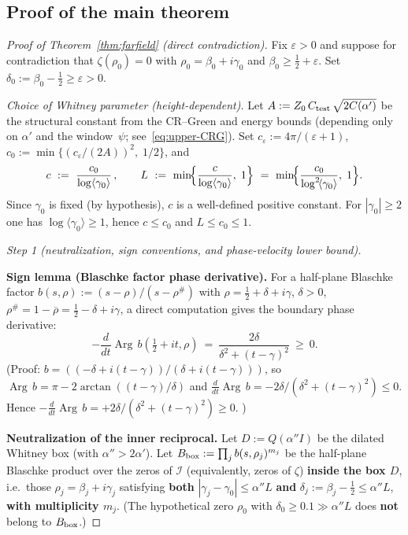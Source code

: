 \documentclass[11pt]{amsart}
\theoremstyle{definition}
\theoremstyle{remark}
\newcommand{\angles}[1]{\langle #1\rangle}
\DeclareMathOperator{\Arg}{Arg}
\begin{document}
\subsection{Proof of the main theorem}\label{sec:proof-farfield}
\begin{proof}[Proof of Theorem~\ref{thm:farfield} (direct contradiction)]
Fix $\varepsilon>0$ and suppose for contradiction that $\zeta(\rho_0)=0$
with $\rho_0=\beta_0+i\gamma_0$ and $\beta_0\ge \tfrac12+\varepsilon$.
Set $\delta_0:=\beta_0-\tfrac12\ge \varepsilon>0$.

\medskip\noindent\emph{Choice of Whitney parameter (height-dependent).}
Let $A:=Z_0\,C_{\rm test}\,\sqrt{2C(\alpha')}$ be the structural constant from the CR--Green
and energy bounds (depending only on $\alpha'$ and the window~$\psi$; see~\eqref{eq:upper-CRG}).
Set $c_\varepsilon:=4\pi/(\varepsilon+1)$, $c_0:=\min\bigl\{(c_\varepsilon/(2A))^2,\;1/2\bigr\}$, and
\[
  c\ :=\ \frac{c_0}{\log\angles{\gamma_0}}\,,\qquad
  L\ :=\ \min\!\Bigl\{\frac{c}{\log\angles{\gamma_0}},\;1\Bigr\}
  \ =\ \min\!\Bigl\{\frac{c_0}{\log^2\!\angles{\gamma_0}},\;1\Bigr\}.
\]
Since $\gamma_0$ is fixed (by hypothesis), $c$ is a well-defined positive constant.
For $|\gamma_0|\ge 2$ one has $\log\angles{\gamma_0}\ge 1$, hence $c\le c_0$ and $L\le c_0\le 1$.

\medskip\noindent\emph{Step 1 (neutralization, sign conventions, and phase-velocity lower bound).}

\noindent\textbf{Sign lemma (Blaschke factor phase derivative).}
For a half-plane Blaschke factor \(b(s,\rho):=(s-\rho)/(s-\rho^\#)\)
with \(\rho=\tfrac12+\delta+i\gamma\), \(\delta>0\), \(\rho^\#=1-\overline\rho=\tfrac12-\delta+i\gamma\),
a direct computation gives the boundary phase derivative:
\[
  -\frac{d}{dt}\Arg\,b(\tfrac12+it,\rho)
  \ =\ \frac{2\delta}{\delta^2+(t-\gamma)^2}\ \ge\ 0.
\]
(Proof: \(b=((-\delta+i(t-\gamma))/(\delta+i(t-\gamma)))\), so
\(\Arg\,b=\pi-2\arctan((t-\gamma)/\delta)\) and
\(\frac{d}{dt}\Arg\,b=-2\delta/(\delta^2+(t-\gamma)^2)\le 0\).
Hence \(-\frac{d}{dt}\Arg\,b=+2\delta/(\delta^2+(t-\gamma)^2)\ge 0\). \checkmark)

\medskip
\noindent\textbf{Neutralization of the inner reciprocal.}
Let \(D:=Q(\alpha''I)\) be the dilated Whitney box (with \(\alpha''>2\alpha'\)).
Let \(B_{\rm box}:=\prod_j b(s,\rho_j)^{m_j}\) be the half-plane Blaschke product
over the zeros of \(\mathcal I\) (equivalently, zeros of \(\zeta\))
\textbf{inside the box \(D\)}, i.e.\ those \(\rho_j=\beta_j+i\gamma_j\)
satisfying \textbf{both} \(|\gamma_j-\gamma_0|\le\alpha''L\) \textbf{and}
\(\delta_j:=\beta_j-\tfrac12\le\alpha''L\),
\textbf{with multiplicity \(m_j\)}.
(The hypothetical zero \(\rho_0\) with \(\delta_0\ge 0.1\gg\alpha''L\)
does \textbf{not} belong to \(B_{\rm box}\).)


\end{proof}
\end{document}
